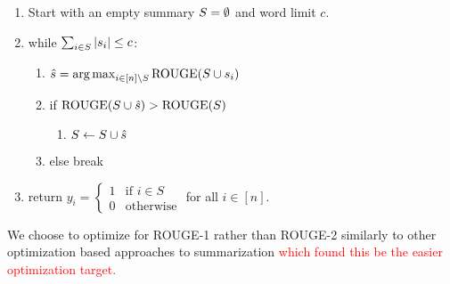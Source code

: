 \begin{enumerate}
\item Start with an empty summary $\summary = 
\null \emptyset$ and word limit $c$. 
\item while $\sum_{i \in \summary} |\sent[i]| \le c$:
    \begin{enumerate}
        \item $\hat{\sent} = {\argmax}_{ i \in [\docSize] \setminus \summary} \operatorname{ROUGE}(\summary \cup \sent[i])$
\item if $\operatorname{ROUGE}(\summary \cup \hat{\sent}) > \operatorname{ROUGE}(\summary)$
    \begin{enumerate}
        \item $\summary \leftarrow \summary \cup \hat{\sent}$
    \end{enumerate}
\item else break

\end{enumerate}
\item return $y_i =\begin{cases} 1 & \textrm{if $i \in S$}\\ 0 & \textrm{otherwise} \end{cases}$ for all $i \in [n]$.
\end{enumerate}
We choose to optimize for ROUGE-1 rather than 
ROUGE-2 similarly to other optimization based approaches to summarization 
\textcolor{red}{
\cite{durrett2016learning,sipos2012large,nallapati2017summarunner} which found this
be the easier optimization target.}



